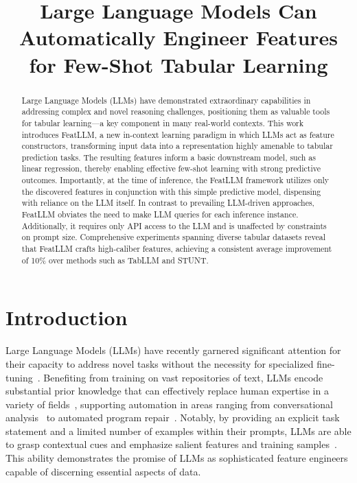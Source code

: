 \title{Large Language Models Can Automatically Engineer Features for Few-Shot Tabular Learning}

\begin{abstract}
Large Language Models (LLMs) have demonstrated extraordinary capabilities in addressing complex and novel reasoning challenges, positioning them as valuable tools for tabular learning—a key component in many real-world contexts. This work introduces \textsf{FeatLLM}, a new in-context learning paradigm in which LLMs act as feature constructors, transforming input data into a representation highly amenable to tabular prediction tasks. The resulting features inform a basic downstream model, such as linear regression, thereby enabling effective few-shot learning with strong predictive outcomes. Importantly, at the time of inference, the \textsf{FeatLLM} framework utilizes only the discovered features in conjunction with this simple predictive model, dispensing with reliance on the LLM itself. In contrast to prevailing LLM-driven approaches, \textsf{FeatLLM} obviates the need to make LLM queries for each inference instance. Additionally, it requires only API access to the LLM and is unaffected by constraints on prompt size. Comprehensive experiments spanning diverse tabular datasets reveal that \textsf{FeatLLM} crafts high-caliber features, achieving a consistent average improvement of 10\% over methods such as TabLLM and STUNT.
\end{abstract}

\section{Introduction}
Large Language Models (LLMs) have recently garnered significant attention for their capacity to address novel tasks without the necessity for specialized fine-tuning~\cite{creswell2022selection,imani2023mathprompter,taylor2022galactica}. Benefiting from training on vast repositories of text, LLMs encode substantial prior knowledge that can effectively replace human expertise in a variety of fields~\cite{Genomes2021,singhal2023large,wilcox2003role}, supporting automation in areas ranging from conversational analysis~\cite{finch2023leveraging} to automated program repair~\cite{fan2023automated}. Notably, by providing an explicit task statement and a limited number of examples within their prompts, LLMs are able to grasp contextual cues and emphasize salient features and training samples~\cite{brown2020language,zhao2023survey}. This ability demonstrates the promise of LLMs as sophisticated feature engineers capable of discerning essential aspects of data. 

